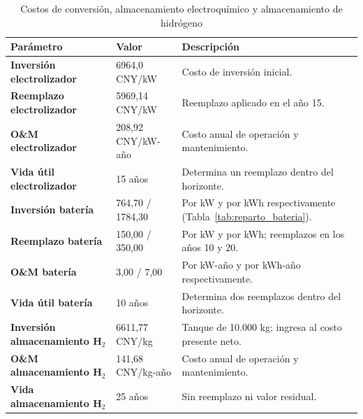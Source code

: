 \begin{table}[H]
\centering
\caption{Costos de conversión, almacenamiento electroquímico y almacenamiento de hidrógeno}
\label{tab:parametros_costos_conversion_replica}
\begin{tabular}{p{4.2cm} p{3.0cm} p{8.1cm}}
\hline
\textbf{Parámetro} & \textbf{Valor} & \textbf{Descripción} \\
\hline
\textbf{Inversión electrolizador} & 6964,0 CNY/kW & Costo de inversión inicial. \\
\textbf{Reemplazo electrolizador} & 5969,14 CNY/kW & Reemplazo aplicado en el año 15. \\
\textbf{O\&M electrolizador} & 208,92 CNY/kW-año & Costo anual de operación y mantenimiento. \\
\textbf{Vida útil electrolizador} & 15 años & Determina un reemplazo dentro del horizonte. \\
\textbf{Inversión batería} & 764,70 / 1784,30 & Por kW y por kWh respectivamente (Tabla~\ref{tab:reparto_bateria}). \\
\textbf{Reemplazo batería} & 150,00 / 350,00 & Por kW y por kWh; reemplazos en los años 10 y 20. \\
\textbf{O\&M batería} & 3,00 / 7,00 & Por kW-año y por kWh-año respectivamente. \\
\textbf{Vida útil batería} & 10 años & Determina dos reemplazos dentro del horizonte. \\
\textbf{Inversión almacenamiento H$_2$} & 6611,77 CNY/kg & Tanque de 10.000 kg; ingresa al costo presente neto. \\
\textbf{O\&M almacenamiento H$_2$} & 141,68 CNY/kg-año & Costo anual de operación y mantenimiento. \\
\textbf{Vida almacenamiento H$_2$} & 25 años & Sin reemplazo ni valor residual. \\
\hline
\end{tabular}
\end{table}

\endgroup
